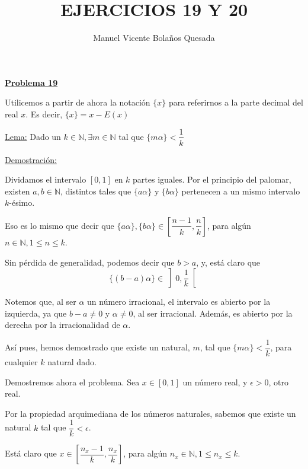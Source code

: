 \documentclass[10pt,a4paper]{article}
\begin{document}
	\title{EJERCICIOS 19 Y 20}
	\author{Manuel Vicente Bolaños Quesada}
	\date{}
	\maketitle
	
	\begin{flushleft}
		\textbf{\underline{Problema 19}}
	\end{flushleft}

	Utilicemos a partir de ahora la notación $\{x\}$ para referirnos a la parte decimal del real $x$. Es decir, $\{x\} = x - E(x)$ \newline
	
	\underline{Lema:} Dado un $k \in \mathbb{N}, \exists m \in \mathbb{N}$ tal que $\{m \alpha\} < \dfrac{1}{k}$
	
	\underline{Demostración:}
	
	Dividamos el intervalo $[0,1]$ en $k$ partes iguales. Por el principio del palomar, existen $a, b \in \mathbb{N}$, distintos tales que $\{a \alpha\}$ y $ \{b \alpha\}$ pertenecen a un mismo intervalo $k$-ésimo.\newline
	
	 Eso es lo mismo que decir que $\{a \alpha\}, \{b \alpha\} \in \left[ \dfrac{n-1}{k}, \dfrac{n}{k}\right]$, para algún $n \in \mathbb{N}, 1 \leq n \leq k$. \newline
	 
	 Sin pérdida de generalidad, podemos decir que $b > a$, y, está claro que 
	 $$ \{(b-a) \alpha\} \in \left] 0, \dfrac{1}{k} \right[$$
	 
	Notemos que, al ser $\alpha$ un número irracional, el intervalo es abierto por la izquierda, ya que $b - a \neq 0$ y $ \alpha \neq 0$, al ser irracional. Además, es abierto por la derecha por la irracionalidad de $\alpha$. 
	
	Así pues, hemos demostrado que existe un natural, $m$, tal que $\{m \alpha \} < \dfrac{1}{k}$, para cualquier $k$ natural dado. \newline \newline
	
	
	Demostremos ahora el problema. Sea $x \in [0,1]$ un número real, y $\epsilon > 0$, otro real.
	
	Por la propiedad arquimediana de los números naturales, sabemos que existe un natural $k$ tal que $\dfrac{1}{k} < \epsilon$. 
	
	Está claro que $x \in \left [ \dfrac{n_x - 1}{k}, \dfrac{n_x}{k} \right ]$, para algún $n_x \in \mathbb{N}, 1 \leq n_x \leq k$.
	
\end{document}
